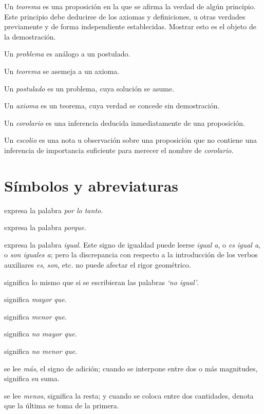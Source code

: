 \documentclass[booklanguage=english]{byrnebook}
\begin{document}
Un \emph{teorema} es una proposición en la que se afirma la verdad de algún principio. Este principio debe deducirse de los axiomas y definiciones, u otras verdades previamente y de forma independiente establecidas. Mostrar esto es el objeto de la demostración.

Un \emph{problema} es análogo a un postulado.

Un \emph{teorema} se asemeja a un axioma.

Un \emph{postulado} es un problema, cuya solución se asume.

Un \emph{axioma} es un teorema, cuya verdad se concede sin demostración.

Un \emph{corolario} es una inferencia deducida inmediatamente de una proposición.

Un \emph{escolio} es una nota u observación sobre una proposición que no contiene una inferencia de importancia suficiente para merecer el nombre de \emph{corolario}.


\chapter*{Símbolos y abreviaturas}

\symb{$\therefore$}
expresa la palabra \emph{por lo tanto}.

\symb{$\because$}
 expresa la palabra \emph{porque}.

\symb{$=$}
 expresa la palabra \emph{igual}. Este signo de igualdad puede leerse \emph{igual a}, o \emph{es igual a}, o \emph{son iguales a}; pero la discrepancia con respecto a la introducción de los verbos auxiliares \emph{es}, \emph{son}, etc. no puede afectar el rigor geométrico.

\symb{$\neq$}
 significa lo mismo que si se escribieran las palabras \emph{‘no igual’}.

\symb{$>$}
 significa \emph{mayor que}.

\symb{$<$}
 significa \emph{menor que}.

\symb{$\ngtr$}
 significa \emph{no mayor que}.

\symb{$\nless$}
 significa \emph{no menor que}.

\symb{$+$}
 se lee \emph{más}, el signo de adición; cuando se interpone entre dos o más magnitudes, significa su suma.

\symb{$-$}
 se lee \emph{menos}, significa la resta; y cuando se coloca entre dos cantidades, denota que la última se toma de la primera.
\end{document}
